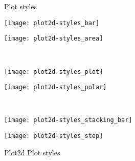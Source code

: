\begin{figure}[H]\label{fig:plot2dPlotStyles}
  \begin{center}
    {\LARGE Plot styles \\[2ex]}
    \begin{minipage}{0.45\linewidth}
      \begin{center}
        \texttt{[image: plot2d-styles\_bar]}
        \label{hc:plot2d_style_bar}
      \end{center}
    \end{minipage}
    \hfill
    \begin{minipage}{0.45\linewidth}
      \begin{center}
        \texttt{[image: plot2d-styles\_area]}
        \label{hc:plot2d_style_area}
      \end{center}
    \end{minipage}\\[3ex]
    \begin{minipage}{0.45\linewidth}
      \begin{center}
        \texttt{[image: plot2d-styles\_plot]}
        \label{hc:plot2d_style_plot}
      \end{center}
    \end{minipage}
    \hfill
    \begin{minipage}{0.45\linewidth}
      \begin{center}
        \texttt{[image: plot2d-styles\_polar]}
        \label{hc:plot2d_style_polar}
      \end{center}
    \end{minipage}\\[3ex]
    \begin{minipage}{0.45\linewidth}
      \begin{center}
        \texttt{[image: plot2d-styles\_stacking\_bar]}
        \label{hc:plot2d_style_stacking_bar}
      \end{center}
    \end{minipage}
    \hfill
    \begin{minipage}{0.45\linewidth}
      \begin{center}
        \texttt{[image: plot2d-styles\_step]}
        \label{hc:plot2d_style_step}
      \end{center}
    \end{minipage}
  \end{center}
  \caption{Plot2d Plot styles}
\end{figure}
%
\newpage

